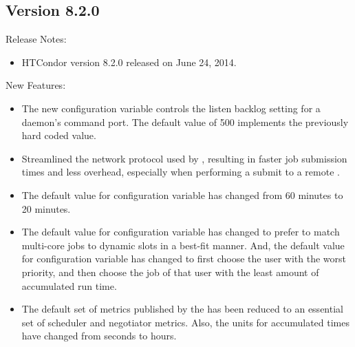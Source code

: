 \subsection*{\label{sec:New-8-2-0}Version 8.2.0}

\noindent Release Notes:

\begin{itemize}

\item HTCondor version 8.2.0 released on June 24, 2014.

\end{itemize}


\noindent New Features:

\begin{itemize}

\item The new configuration variable 
controls the listen backlog setting for a daemon's command port.
The default value of 500 implements the previously hard coded value.

\item Streamlined the network protocol used by ,
resulting in faster job submission times and less  overhead, 
especially when performing a submit to a remote .

\item The default value for configuration variable  
has changed from 60 minutes to 20 minutes.

\item The default value for configuration variable 
 has changed to prefer to match
multi-core jobs to dynamic slots in a best-fit manner.
And, the default value for configuration variable
 has changed to first choose the user with the
worst priority, and then choose the job of that user with the least
amount of accumulated run time. 

\item The default set of metrics published by the  has been
reduced to an essential set of scheduler and negotiator metrics.
Also, the units for accumulated times have changed from seconds to hours.

\end{itemize}

